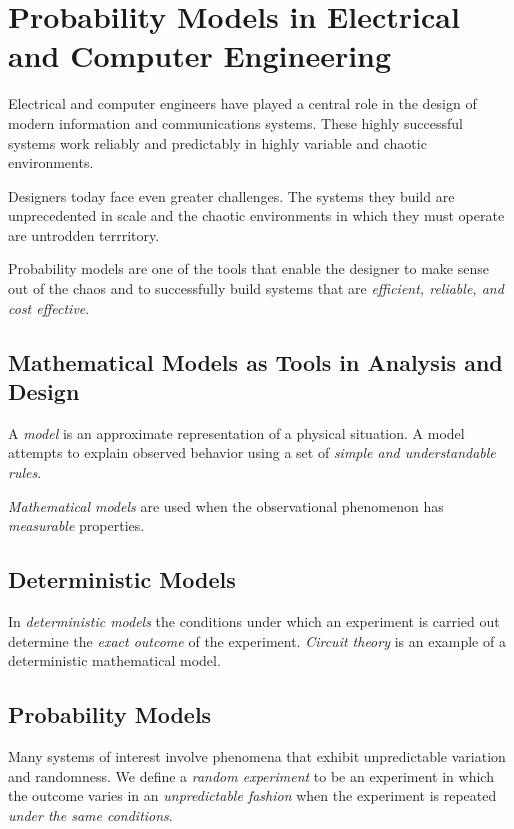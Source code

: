 \chapter{Probability Models in Electrical and Computer Engineering}

\bit
	\item Electrical and computer engineers have played a central role in the design of modern information and communications systems. These highly successful systems work reliably and predictably in highly variable and chaotic environments.

	\item Designers today face even greater challenges.
	The systems they build are unprecedented in scale
	and the chaotic environments in which they must operate are untrodden terrritory.

	\item Probability models are one of the tools that enable the designer
	to make sense out of the chaos and to successfully build systems that are
	\emph{efficient, reliable, and cost effective}.
\eit

\section{Mathematical Models as Tools in Analysis and Design}
\bit
	\item A \emph{model} is an approximate representation
	of a physical situation.
	A model attempts to explain observed behavior
	using a set of \emph{simple and understandable rules}.

	\item \emph{Mathematical models}
	are used when the observational phenomenon has \emph{measurable} properties.
\eit

\section{Deterministic Models}
\bit
	\item In \emph{deterministic models}
	the conditions under which an experiment is carried out
	determine the \emph{exact outcome} of the experiment.
	\emph{Circuit theory} is an example of a deterministic mathematical model.

\eit

\section{Probability Models}
\bit
	\item Many systems of interest involve phenomena
	that exhibit unpredictable variation and randomness.
	We define a \emph{random experiment} to be an experiment
	in which the outcome varies in an \emph{unpredictable fashion}
	when the experiment is repeated \emph{under the same conditions}.

